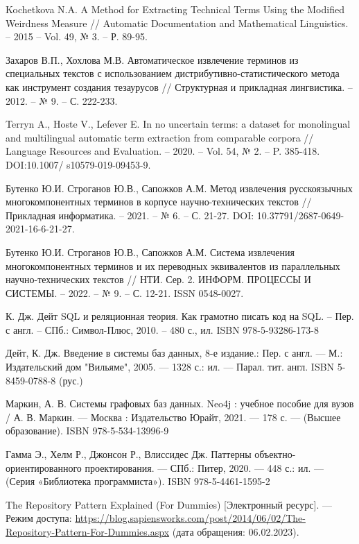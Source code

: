 \begin{thebibliography}{}
	Kochetkova N.A. A Method for Extracting Technical Terms Using the Modified Weirdness Measure // Automatic Documentation and Mathematical Linguistics. – 2015 – Vol. 49, № 3. – Р. 89-95.
	
	Захаров В.П., Хохлова М.В. Автоматическое извлечение терминов из специальных текстов с использованием дистрибутивно-статистического метода как инструмент создания тезаурусов // Структурная и прикладная лингвистика. – 2012. – № 9. – С. 222-233.
	
	Terryn A., Hoste V., Lefever E. In no uncertain terms: a dataset for monolingual and multilingual automatic term extraction from comparable corpora // Language Resources and Evaluation. – 2020. – Vol. 54, № 2. – P. 385-418. DOI:10.1007/ s10579-019-09453-9.
	
	Бутенко Ю.И. Строганов Ю.В., Сапожков А.М. Метод извлечения русскоязычных многокомпонентных терминов в корпусе научно-технических текстов // Прикладная информатика. – 2021. – № 6. – С. 21-27. DOI: 10.37791/2687-0649-2021-16-6-21-27.
	
	Бутенко Ю.И. Строганов Ю.В., Сапожков А.М. Система извлечения многокомпонентных терминов и их переводных эквивалентов из параллельных научно-технических текстов // НТИ. Сер. 2. ИНФОРМ. ПРОЦЕССЫ И СИСТЕМЫ. – 2022. – № 9. – С. 12-21. ISSN 0548-0027.
	
	 К. Дж. Дейт
	SQL и реляционная теория. Как грамотно писать код на SQL. – Пер. с англ. – СПб.: Символ-Плюс, 2010. – 480 с., ил. ISBN 978-5-93286-173-8
	
	Дейт, К. Дж. Введение в системы баз данных, 8-е издание.: Пер. с англ. — М.: Издательский дом "Вильяме", 2005. — 1328 с.: ил. — Парал. тит. англ. ISBN 5-8459-0788-8 (рус.)
	
	Маркин, А. В. Системы графовых баз данных. Neo4j : учебное пособие для вузов / А. В. Маркин. — Москва : Издательство Юрайт, 2021. — 178 с. — (Высшее образование). ISBN 978-5-534-13996-9
	
	Гамма Э., Хелм Р., Джонсон Р., Влиссидес Дж. Паттерны объектно-ориентированного проектирования. — СПб.: Питер, 2020. — 448 с.: ил. — (Серия «Библиотека программиста»). ISBN 978-5-4461-1595-2
	
	The Repository Pattern Explained (For Dummies) [Электронный ресурс]. — Режим доступа: \url{https://blog.sapiensworks.com/post/2014/06/02/The-Repository-Pattern-For-Dummies.aspx} (дата обращения: 06.02.2023).
\end{thebibliography}
\endgroup

\pagebreak